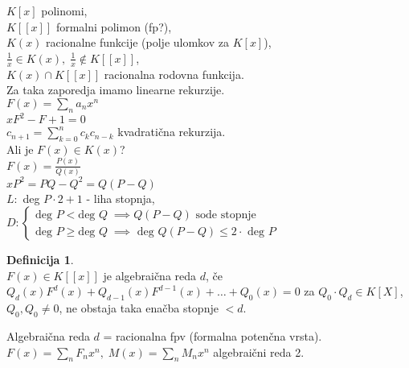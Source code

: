 \documentclass[a4paper, 12pt]{book}
\theoremstyle{definition}
\newtheorem{defn}[counter]{Definicija}
\theoremstyle{remark}
\begin{document}
$K[x]$ polinomi, \\
$K[[x]]$ formalni polimon (fp?), \\
$K(x)$ racionalne funkcije (polje ulomkov za $K[x]$), \\
$\frac{1}{x} \in K(x), \; \frac{1}{x} \notin K[[x]]$, \\
$K(x) \cap K[[x]]$ racionalna rodovna funkcija. \\
Za taka zaporedja imamo linearne rekurzije. \\
$F(x) = \sum_n a_n x^n$ \\
$xF^2 - F + 1 = 0$ \\
$c_{n+1} = \sum_{k=0}^{n} c_k c_{n-k}$ kvadratična rekurzija. \\
Ali je $F(x) \in K(x)$? \\
$F(x) = \frac{P(x)}{Q(x)}$ \\
$xP^2 = PQ - Q^2 = Q(P-Q)$ \\
$L:$ deg $P \cdot 2 + 1$ - liha stopnja, \\
$D: \begin{cases}
  \text{deg } P < \text{deg } Q \; \implies Q(P-Q) \text{ sode stopnje} \\
  \text{deg } P \geq \text{deg } Q \; \implies \text{ deg } Q(P-Q) \leq 2 \cdot \text{ deg } P
\end{cases}$
\begin{defn} \text{} \\
  $F(x) \in K[[x]]$ je algebraična reda $d$, če \\
  $Q_d(x) F^d(x) + Q_{d-1}(x) F^{d-1}(x) + \dots + Q_0(x) = 0$ za $Q_0 \cdot Q_d \in K[X]$,
  $Q_0, Q_0 \neq 0$, ne obstaja taka enačba stopnje $< d$.
\end{defn}
Algebraična reda $d$ = racionalna fpv (formalna potenčna vrsta). \\
$F(x) = \sum_n F_n x^n, \; M(x) = \sum_n M_n x^n$ algebraični reda 2.



%
%



\end{document}

